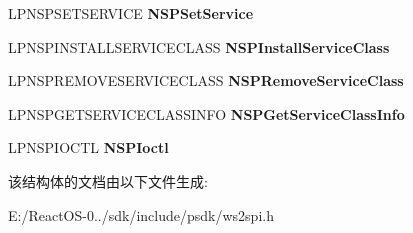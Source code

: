 \begin{DoxyCompactItemize}
\mbox{\label{struct___n_s_p___r_o_u_t_i_n_e_aaa55522344adea1717f7bd27f3a7ba7f}} 
L\+P\+N\+S\+P\+S\+E\+T\+S\+E\+R\+V\+I\+CE {\bfseries N\+S\+P\+Set\+Service}
\item 
\mbox{\label{struct___n_s_p___r_o_u_t_i_n_e_a5d244304500b29f31e429340e62cb0a0}} 
L\+P\+N\+S\+P\+I\+N\+S\+T\+A\+L\+L\+S\+E\+R\+V\+I\+C\+E\+C\+L\+A\+SS {\bfseries N\+S\+P\+Install\+Service\+Class}
\item 
\mbox{\label{struct___n_s_p___r_o_u_t_i_n_e_a0c700b991bebac93a3a64545e91a623c}} 
L\+P\+N\+S\+P\+R\+E\+M\+O\+V\+E\+S\+E\+R\+V\+I\+C\+E\+C\+L\+A\+SS {\bfseries N\+S\+P\+Remove\+Service\+Class}
\item 
\mbox{\label{struct___n_s_p___r_o_u_t_i_n_e_aca72abe900394e9ddb387a78685cb8a1}} 
L\+P\+N\+S\+P\+G\+E\+T\+S\+E\+R\+V\+I\+C\+E\+C\+L\+A\+S\+S\+I\+N\+FO {\bfseries N\+S\+P\+Get\+Service\+Class\+Info}
\item 
\mbox{\label{struct___n_s_p___r_o_u_t_i_n_e_a94c0b1f8b1ebd9fcaf459f5de00b9748}} 
L\+P\+N\+S\+P\+I\+O\+C\+TL {\bfseries N\+S\+P\+Ioctl}
\end{DoxyCompactItemize}


该结构体的文档由以下文件生成\+:\begin{DoxyCompactItemize}
\item 
E\+:/\+React\+O\+S-\/0../sdk/include/psdk/ws2spi.\+h\end{DoxyCompactItemize}
